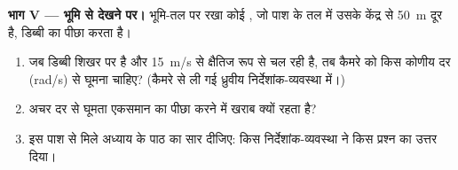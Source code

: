 \begin{problem}
\medskip
\noindent\textbf{भाग V --- भूमि से देखने पर।}
भूमि-तल पर रखा कोई , जो पाश के तल में उसके केंद्र से \qty{50}{m} दूर है,
डिब्बी का पीछा करता है।
\begin{enumerate}[resume]
  \item जब डिब्बी शिखर पर है और \qty{15}{m/s} से क्षैतिज रूप से चल रही है,
        तब कैमरे को किस कोणीय दर (rad/s) से घूमना चाहिए? (कैमरे से ली गई
        ध्रुवीय निर्देशांक-व्यवस्था में।)
  \item अचर दर से घूमता  एकसमान  का पीछा करने में खराब
        क्यों रहता है?
  \item इस पाश से मिले अध्याय के पाठ का सार दीजिए: किस
        निर्देशांक-व्यवस्था ने किस प्रश्न का उत्तर दिया।
\end{enumerate}
\end{problem}
